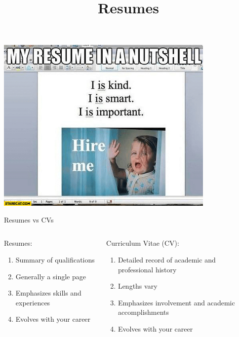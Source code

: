 \documentclass[aspectratio=169]{beamer}
\title{Resumes}
\institute{Engineers for Exploration, UC San Diego}
\begin{document}
\maketitle
\begin{frame}
    \centering
    \includegraphics[width=0.8\textwidth,height=0.8\textheight,keepaspectratio]{resume_meme_2.png}
\end{frame}
\begin{frame}{Resumes vs CVs}
    \begin{columns}
        \begin{column}{0.45\textwidth}
            Resumes:
            \begin{enumerate}
                \item Summary of qualifications
                \item Generally a single page
                \item Emphasizes skills and experiences
                \item Evolves with your career
            \end{enumerate}
        \end{column}
        \begin{column}{0.45\textwidth}
            Curriculum Vitae (CV):
            \begin{enumerate}
                \item Detailed record of academic and professional history
                \item Lengths vary
                \item Emphasizes involvement and academic accomplishments
                \item Evolves with your career
            \end{enumerate}
        \end{column}
    \end{columns}
\end{frame}
\end{document}
